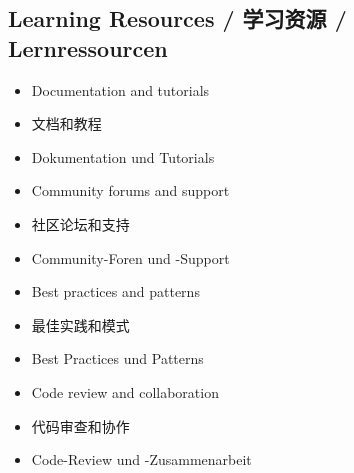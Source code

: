 \subsection{Learning Resources / 学习资源 / Lernressourcen}
\begin{itemize}
    \item Documentation and tutorials
    \item 文档和教程
    \item Dokumentation und Tutorials
    \item Community forums and support
    \item 社区论坛和支持
    \item Community-Foren und -Support
    \item Best practices and patterns
    \item 最佳实践和模式
    \item Best Practices und Patterns
    \item Code review and collaboration
    \item 代码审查和协作
    \item Code-Review und -Zusammenarbeit
\end{itemize}
